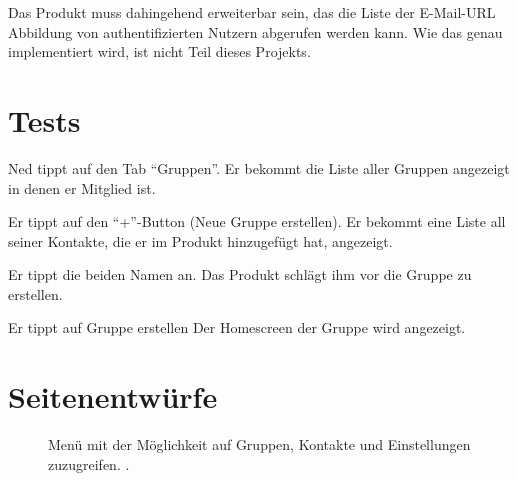 \documentclass[parskip=full,11pt]{scrartcl}
\begin{document}
Das Produkt muss dahingehend erweiterbar sein,
das die Liste der E-Mail-URL Abbildung von authentifizierten Nutzern
abgerufen werden kann.
Wie das genau implementiert wird, ist nicht Teil dieses Projekts.

\section{Tests}


{Ned tippt auf den Tab  \enquote{Gruppen}.}
{Er bekommt die Liste aller Gruppen angezeigt in denen er Mitglied ist.}

{Er tippt auf den \enquote{+}-Button (Neue Gruppe erstellen).}
{Er bekommt eine Liste all seiner Kontakte, die er im Produkt hinzugefügt hat, angezeigt.}

{Er tippt die beiden Namen an.}
{Das Produkt schlägt ihm vor die Gruppe zu erstellen.}

{Er tippt auf Gruppe erstellen}
{Der Homescreen der Gruppe wird angezeigt.} %

\pagebreak
\appendix

\section{Seitenentwürfe}


\begin{figure}[hb]
	\caption{\label{fig:menu}
		Menü mit der Möglichkeit auf Gruppen, Kontakte und Einstellungen zuzugreifen.
		 .
	}
\end{figure}
\end{document}
